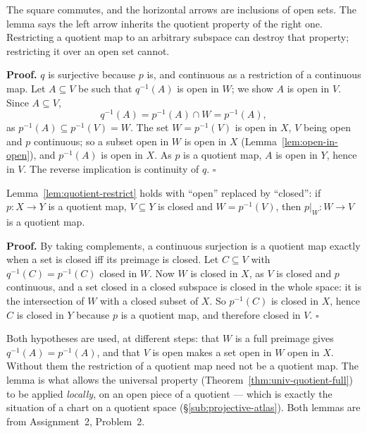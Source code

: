 \documentclass[11pt]{report}
\makeatletter
\newcounter{thmcounter}[section]
\renewenvironment{proof}[1][Proof]{\noindent\textbf{#1.} }{\hfill$\square$\par\vspace{5pt}}
\newcommand{\thmlabel}[1]{\edef\@currentlabel{\arabic{section}.\arabic{thmcounter}}\label{#1}}
\newcommand{\leeref}[1]{\par\smallskip{\raggedleft\footnotesize\textsc{Lee}:\ #1\par}}
\makeatother
\begin{document}
The square commutes, and the horizontal arrows are inclusions of open sets. The lemma says the left arrow inherits the quotient property of the right one. Restricting a quotient map to an arbitrary subspace can destroy that property; restricting it over an open set cannot.


\begin{proof}
$q$ is surjective because $p$ is, and continuous as a restriction of a continuous map. Let $A \subseteq V$ be such that $q^{-1}(A)$ is open in $W$; we show $A$ is open in $V$. Since $A \subseteq V$,
\[
q^{-1}(A) = p^{-1}(A) \cap W = p^{-1}(A),
\]
as $p^{-1}(A) \subseteq p^{-1}(V) = W$. The set $W = p^{-1}(V)$ is open in $X$, $V$ being open and $p$ continuous; so a subset open in $W$ is open in $X$ (Lemma~\ref{lem:open-in-open}), and $p^{-1}(A)$ is open in $X$. As $p$ is a quotient map, $A$ is open in $Y$, hence in $V$. The reverse implication is continuity of $q$.
\end{proof}

\begin{lembox}\thmlabel{lem:quotient-restrict-closed}
Lemma~\ref{lem:quotient-restrict} holds with ``open'' replaced by ``closed'': if $p : X \to Y$ is a quotient map, $V \subseteq Y$ is closed and $W = p^{-1}(V)$, then $p|_W : W \to V$ is a quotient map.
\leeref{Theorem A.27(e)}
\end{lembox}

\begin{proof}
By taking complements, a continuous surjection is a quotient map exactly when a set is closed iff its preimage is closed. Let $C \subseteq V$ with $q^{-1}(C) = p^{-1}(C)$ closed in $W$. Now $W$ is closed in $X$, as $V$ is closed and $p$ continuous, and a set closed in a closed subspace is closed in the whole space: it is the intersection of $W$ with a closed subset of $X$. So $p^{-1}(C)$ is closed in $X$, hence $C$ is closed in $Y$ because $p$ is a quotient map, and therefore closed in $V$.
\end{proof}

\begin{rembox}\label{rem:new-spaces-5}
Both hypotheses are used, at different steps: that $W$ is a full preimage gives $q^{-1}(A) = p^{-1}(A)$, and that $V$ is open makes a set open in $W$ open in $X$. Without them the restriction of a quotient map need not be a quotient map. The lemma is what allows the universal property (Theorem~\ref{thm:univ-quotient-full}) to be applied \emph{locally}, on an open piece of a quotient --- which is exactly the situation of a chart on a quotient space (\S\ref{sub:projective-atlas}). Both lemmas are from Assignment~2, Problem~2.
\end{rembox}
\end{document}
